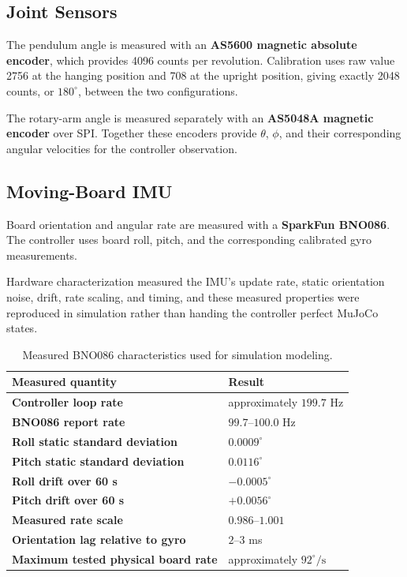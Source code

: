 \documentclass[9pt]{extarticle}
\begin{document}
\subsection{Joint Sensors}

The pendulum angle is measured with an \textbf{AS5600 magnetic absolute
encoder}, which provides 4096 counts per revolution. Calibration uses raw
value 2756 at the hanging position and 708 at the upright position, giving
exactly 2048 counts, or $180^\circ$, between the two configurations.

The rotary-arm angle is measured separately with an \textbf{AS5048A
magnetic encoder} over SPI. Together these encoders provide $\theta$,
$\phi$, and their corresponding angular velocities for the controller
observation.


\subsection{Moving-Board IMU}

Board orientation and angular rate are measured with a
\textbf{SparkFun BNO086}. The controller uses board roll, pitch, and the
corresponding calibrated gyro measurements.

Hardware characterization measured the IMU's update rate, static
orientation noise, drift, rate scaling, and timing, and these measured
properties were reproduced in simulation rather than handing the controller
perfect MuJoCo states.

\begin{table}[h]
\centering
\small
\caption{Measured BNO086 characteristics used for simulation modeling.}
\begin{tabularx}{0.78\linewidth}{>{\bfseries}X X}
\toprule
Measured quantity & Result \\
\midrule
Controller loop rate & approximately $199.7$ Hz \\
BNO086 report rate & $99.7$--$100.0$ Hz \\
Roll static standard deviation & $0.0009^\circ$ \\
Pitch static standard deviation & $0.0116^\circ$ \\
Roll drift over 60 s & $-0.0005^\circ$ \\
Pitch drift over 60 s & $+0.0056^\circ$ \\
Measured rate scale & $0.986$--$1.001$ \\
Orientation lag relative to gyro & $2$--$3$ ms \\
Maximum tested physical board rate & approximately $92^\circ/\mathrm{s}$ \\
\bottomrule
\end{tabularx}
\end{table}
\end{document}
